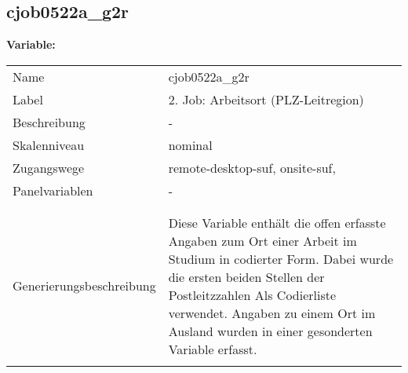 	
	
	\subsection{cjob0522a\_g2r}
	\label{subSection:cjob0522a_g2r}

	\noindent\textbf{Variable:}\\
		\begin{tabular}{lL{11.3cm}}
			\label{tableVariable:cjob0522a_g2r}
			Name & cjob0522a\_g2r \\
			Label & 2. Job: Arbeitsort (PLZ-Leitregion) \\
			Beschreibung & - \\
			Skalenniveau & nominal \\
			Zugangswege &
				remote-desktop-suf,
				onsite-suf,
 \\
			Panelvariablen & -
			 \\
			 \\
 \\
					Generierungsbeschreibung & Diese Variable enthält die offen erfasste Angaben zum Ort einer Arbeit im Studium in codierter Form. Dabei wurde die ersten beiden Stellen der Postleitzzahlen Als Codierliste verwendet. Angaben zu einem Ort im Ausland wurden in einer gesonderten Variable erfasst.
				 \\	
			 \\
		\end{tabular}






